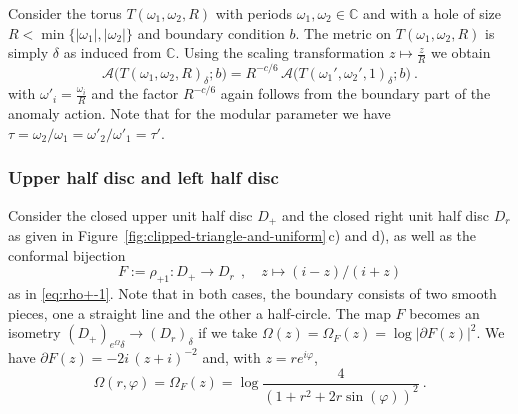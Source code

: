 \documentclass[11pt,a4paper]{article}
\numberwithin{equation}{section}
\begin{document}
Consider the torus $T(\omega_1,\omega_2,R)$ with periods $\omega_1,\omega_2 \in \mathbb{C}$ and with a hole of size $R<\min\{|\omega_1|,|\omega_2|\}$ and boundary condition $b$. The metric on $T(\omega_1,\omega_2,R)$ is simply $\delta$ as induced from $\mathbb{C}$. Using the scaling transformation $z\mapsto \tfrac{z}{R}$ we obtain 
%
\begin{equation}\label{eq:ZBR}
\mathcal{A}\big(T(\omega_1,\omega_2,R)_\delta;b\big) 
=
R^{-c/6}\,
\mathcal{A}\big(T(\omega_1',\omega_2',1)_\delta;b\big) 
\ .
\end{equation}%
with $\omega'_i = \frac{\omega_i}{R}$ and the factor $R^{-c/6}$ again follows from the boundary part of the anomaly action. Note that for the modular parameter we have $\tau = \omega_2/\omega_1 =\omega'_2/\omega'_1 = \tau'$. 

\subsubsection{Upper half disc and left half disc}

Consider the closed upper unit half disc $D_+$ and the closed right unit half disc $D_r$ as given in Figure~\ref{fig:clipped-triangle-and-uniform}\,c) and d), as well as the conformal bijection 
\begin{equation}
F := \rho_{+1} : D_+ \to D_r
~~,\quad 
z \mapsto (i-z)/(i+z)
\end{equation}
as in \eqref{eq:rho+-1}. Note that in both cases, the boundary consists of two smooth pieces, one a straight line and the other a half-circle.
The map $F$ becomes an isometry $(D_+)_{e^\Omega\delta} \to (D_r)_{\delta}$ if we take $\Omega(z) = \Omega_F(z) = \log |\partial F(z)|^2$. We have
$\partial F(z) = -2i \, (z+i)^{-2}$
and, with $z=r e^{i\varphi}$,
%
\begin{equation}
    \Omega(r,\varphi) = \Omega_F(z) = \log \frac{4}{(1+r^2 +2r\sin(\varphi))^2} \ .
\end{equation}
\end{document}
